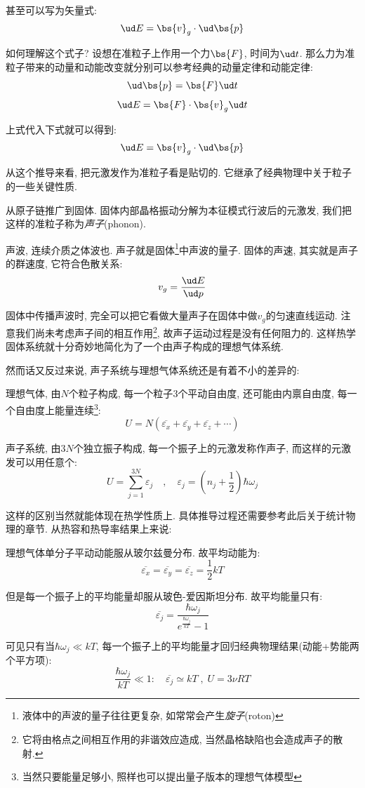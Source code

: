 甚至可以写为矢量式:
\[\ud E=\bs{v}_g\cdot \ud \bs{p}\]

如何理解这个式子? 设想在准粒子上作用一个力$\bs{F}$, 时间为$\ud t$. 那么力为准粒子带来的动量和动能改变就分别可以参考经典的动量定律和动能定律:
\[\ud\bs{p}=\bs{F}\ud t\]
\[\ud E=\bs{F}\cdot \bs{v}_g\ud t\]

上式代入下式就可以得到:
\[\ud E=\bs{v}_g\cdot \ud \bs{p}\]

从这个推导来看, 把元激发作为准粒子看是贴切的. 它继承了经典物理中关于粒子的一些关键性质.

从原子链推广到固体. 固体内部晶格振动分解为本征模式行波后的元激发, 我们把这样的准粒子称为\emph{声子}(phonon).

\vspace{1cm}

声波, 连续介质之体波也. 声子就是固体\footnote{液体中的声波的量子往往更复杂, 如常常会产生\emph{旋子}(roton)}中声波的量子. 固体的声速, 其实就是声子的群速度, 它符合色散关系:
\[v_g=\frac{\ud E}{\ud p}\]

固体中传播声波时, 完全可以把它看做大量声子在固体中做$v_g$的匀速直线运动. 注意我们尚未考虑声子间的相互作用\footnote{它将由格点之间相互作用的非谐效应造成, 当然晶格缺陷也会造成声子的散射.}, 故声子运动过程是没有任何阻力的. 这样热学固体系统就十分奇妙地简化为了一个由声子构成的理想气体系统.

然而话又反过来说, 声子系统与理想气体系统还是有着不小的差异的:

理想气体, 由$N$个粒子构成, 每一个粒子$3$个平动自由度, 还可能由内禀自由度, 每一个自由度上能量连续\footnote{当然只要能量足够小, 照样也可以提出量子版本的理想气体模型}:
\[U=N(\overline{\varepsilon_x}+\overline{\varepsilon_y}+\overline{\varepsilon_z}+\cdots)\]

声子系统, 由$3N$个独立振子构成, 每一个振子上的元激发称作声子, 而这样的元激发可以用任意个:
\[U=\sum_{j=1}^{3N}\varepsilon_j\quad ,\quad \varepsilon_j=\left(n_j+\frac{1}{2}\right)\hbar\omega_j\]

这样的区别当然就能体现在热学性质上. 具体推导过程还需要参考此后关于统计物理的章节. 从热容和热导率结果上来说:

理想气体单分子平动动能服从玻尔兹曼分布. 故平均动能为:
\[\overline{\varepsilon_x}=\overline{\varepsilon_y}=\overline{\varepsilon_z}=\frac{1}{2}kT\]

但是每一个振子上的平均能量却服从玻色-爱因斯坦分布. 故平均能量只有:
\[\overline{\varepsilon_j}=\frac{\hbar \omega_j}{e^{\frac{\hbar \omega_j}{kT}}-1}\]

可见只有当$\hbar \omega_j\ll kT$, 每一个振子上的平均能量才回归经典物理结果(动能+势能两个平方项):
\[\frac{\hbar \omega_j}{kT}\ll 1:\quad \overline{\varepsilon_j}\simeq kT\;,\; U=3\nu RT\]

